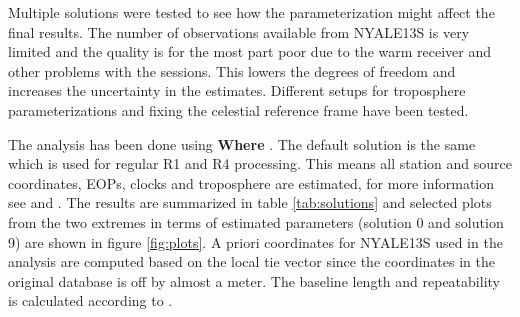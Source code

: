 Multiple solutions were tested to see how the parameterization might affect the final results. The number of observations
available from NYALE13S is very limited and the quality is for the most part poor due to the warm receiver and other
problems with the sessions. This lowers the degrees of freedom and increases the uncertainty in the estimates. Different
setups for troposphere parameterizations and fixing the celestial reference frame have been tested.

The analysis has been done using \textbf{Where} \cite{hjelle2018}. The default solution is the same which is used for 
regular R1 and R4 processing. This means all station and source coordinates, EOPs, clocks and troposphere are estimated, 
for more information see \cite{kirkvik2017b} and \cite{kirkvik2019}. The results are summarized in table 
\ref{tab:solutions} and selected plots from the two extremes in terms of estimated parameters (solution 0 and solution 9) 
are shown in figure \ref{fig:plots}. A priori coordinates for NYALE13S used in the analysis are computed based on the local 
tie vector since the coordinates in the original database is off by almost a meter. The baseline length and repeatability is 
calculated according to \cite{hofmeister2016}.
 

